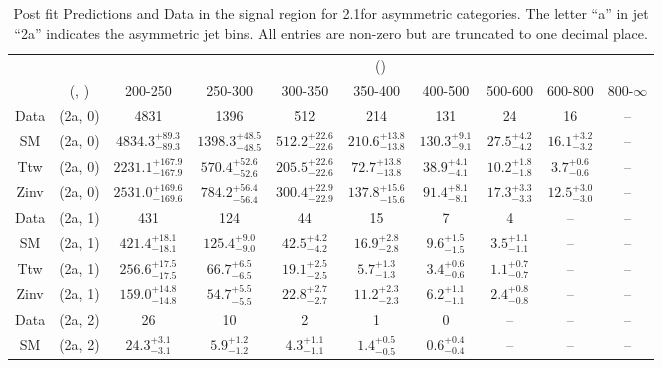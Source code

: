 \begin{table}[h!]
\tiny
\centering
\caption{Post fit Predictions and Data in the signal region for 2.1\ifb for asymmetric categories. The letter ``a'' in jet \eg ``2a''  indicates the asymmetric jet bins. All entries are non-zero but are truncated to one decimal place.\label{tab:predallpost_sig_comb_asym}}
\begin{tabular}
{cccccccccc}
	\hline\hline
	&	& \multicolumn{8}{c}{\scalht (\gev)}\\ 
	&	 (\njet, \nb) & 200-250 & 250-300 & 300-350 & 350-400 & 400-500 & 500-600 & 600-800 & 800-$\infty$ \\ [0.8ex] 
\hline
	Data & (2a, 0) & 4831 & 1396 & 512 & 214 & 131 & 24 & 16 & -- \\[0.5ex] 
	SM & (2a, 0) & $4834.3^{+ 89.3 }_{- 89.3 }$ & $1398.3^{+ 48.5 }_{- 48.5 }$ & $512.2^{+ 22.6 }_{- 22.6 }$ & $210.6^{+ 13.8 }_{- 13.8 }$ & $130.3^{+ 9.1 }_{- 9.1 }$ & $27.5^{+ 4.2 }_{- 4.2 }$ & $16.1^{+ 3.2 }_{- 3.2 }$ & -- \\[0.5ex] 
	Ttw & (2a, 0) & $2231.1^{+ 167.9 }_{- 167.9 }$ & $570.4^{+ 52.6 }_{- 52.6 }$ & $205.5^{+ 22.6 }_{- 22.6 }$ & $72.7^{+ 13.8 }_{- 13.8 }$ & $38.9^{+ 4.1 }_{- 4.1 }$ & $10.2^{+ 1.8 }_{- 1.8 }$ & $3.7^{+ 0.6 }_{- 0.6 }$ & -- \\[0.5ex] 
	Zinv & (2a, 0) & $2531.0^{+ 169.6 }_{- 169.6 }$ & $784.2^{+ 56.4 }_{- 56.4 }$ & $300.4^{+ 22.9 }_{- 22.9 }$ & $137.8^{+ 15.6 }_{- 15.6 }$ & $91.4^{+ 8.1 }_{- 8.1 }$ & $17.3^{+ 3.3 }_{- 3.3 }$ & $12.5^{+ 3.0 }_{- 3.0 }$ & -- \\[0.5ex] 
	Data & (2a, 1) & 431 & 124 & 44 & 15 & 7 & 4 & -- & -- \\[0.5ex] 
	SM & (2a, 1) & $421.4^{+ 18.1 }_{- 18.1 }$ & $125.4^{+ 9.0 }_{- 9.0 }$ & $42.5^{+ 4.2 }_{- 4.2 }$ & $16.9^{+ 2.8 }_{- 2.8 }$ & $9.6^{+ 1.5 }_{- 1.5 }$ & $3.5^{+ 1.1 }_{- 1.1 }$ & -- & -- \\[0.5ex] 
	Ttw & (2a, 1) & $256.6^{+ 17.5 }_{- 17.5 }$ & $66.7^{+ 6.5 }_{- 6.5 }$ & $19.1^{+ 2.5 }_{- 2.5 }$ & $5.7^{+ 1.3 }_{- 1.3 }$ & $3.4^{+ 0.6 }_{- 0.6 }$ & $1.1^{+ 0.7 }_{- 0.7 }$ & -- & -- \\[0.5ex] 
	Zinv & (2a, 1) & $159.0^{+ 14.8 }_{- 14.8 }$ & $54.7^{+ 5.5 }_{- 5.5 }$ & $22.8^{+ 2.7 }_{- 2.7 }$ & $11.2^{+ 2.3 }_{- 2.3 }$ & $6.2^{+ 1.1 }_{- 1.1 }$ & $2.4^{+ 0.8 }_{- 0.8 }$ & -- & -- \\[0.5ex] 
	Data & (2a, 2) & 26 & 10 & 2 & 1 & 0 & -- & -- & -- \\[0.5ex] 
	SM & (2a, 2) & $24.3^{+ 3.1 }_{- 3.1 }$ & $5.9^{+ 1.2 }_{- 1.2 }$ & $4.3^{+ 1.1 }_{- 1.1 }$ & $1.4^{+ 0.5 }_{- 0.5 }$ & $0.6^{+ 0.4 }_{- 0.4 }$ & -- & -- & -- \\[0.5ex] 

\end{tabular}
\end{table}
